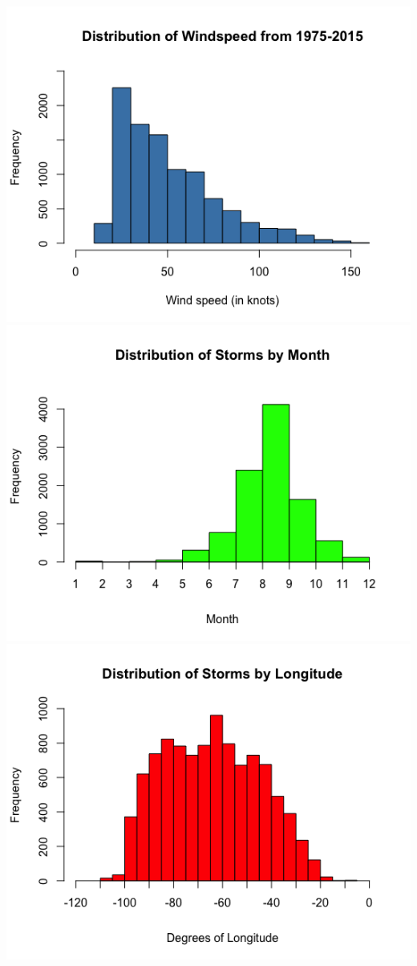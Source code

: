 \ee

\clearpage


\bbox
\begin{center}
\includegraphics[width=0.3\tw]{02/fig-windspeed-hist.png}
\includegraphics[width=0.3\tw]{02/fig-month-hist.png}
\includegraphics[width=0.3\tw]{02/fig-long-hist.png} 
\end{center}

